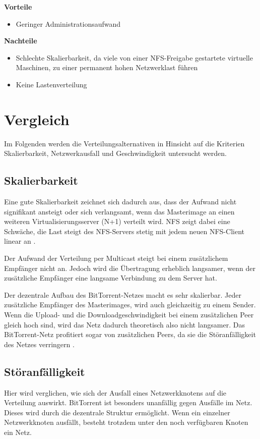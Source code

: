 
\textbf{Vorteile}
\begin{itemize}
 \item Geringer Administrationsaufwand
\end{itemize}

\textbf{Nachteile}
\begin{itemize}
 \item Schlechte Skalierbarkeit, da viele von einer NFS-Freigabe gestartete virtuelle Maschinen, zu einer permanent hohen Netzwerklast führen
 \item Keine Lastenverteilung
\end{itemize}

\section{Vergleich}
Im Folgenden werden die Verteilungsalternativen in Hinsicht auf die Kriterien Skalierbarkeit, Netzwerkausfall und Geschwindigkeit untersucht werden.

{ \fontsize{12.4pt}{16pt}\selectfont
\subsection{Skalierbarkeit}
Eine gute Skalierbarkeit zeichnet sich dadurch aus, dass der Aufwand nicht signifikant ansteigt oder sich verlangsamt, wenn das Masterimage an einen weiteren Virtualisierungsserver (N+1) verteilt wird. NFS zeigt dabei eine Schwäche, die Last steigt des NFS-Servers stetig mit jedem neuen NFS-Client linear an \cite{nfsharmful}. 

Der Aufwand der Verteilung per Multicast steigt bei einem zusätzlichem Empfänger nicht an. Jedoch wird die Übertragung erheblich langsamer, wenn der zusätzliche Empfänger eine langsame Verbindung zu dem Server hat. 

Der dezentrale Aufbau des BitTorrent-Netzes macht es sehr skalierbar. Jeder zusätzliche Empfänger des Masterimages, wird auch gleichzeitig zu einem Sender. Wenn die Upload- und die Downloadgeschwindigkeit bei einem zusätzlichen Peer gleich hoch sind, wird das Netz dadurch theoretisch also nicht langsamer. Das BitTorrent-Netz profitiert sogar von zusätzlichen Peers, da sie die Störanfälligkeit des Netzes verringern \cite{btscalability}. 

\subsection{Störanfälligkeit}
Hier wird verglichen, wie sich der Ausfall eines Netzwerkknotens auf die Verteilung auswirkt. BitTorrent ist besonders unanfällig gegen Ausfälle im Netz. Dieses wird durch die dezentrale Struktur ermöglicht. Wenn ein einzelner Netzwerkknoten ausfällt, besteht trotzdem unter den noch verfügbaren Knoten ein Netz. }

